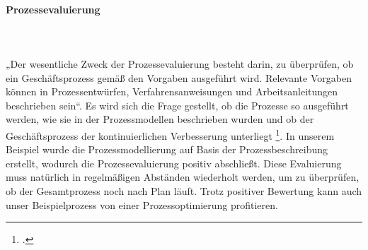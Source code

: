 \paragraph{Prozessevaluierung}\mbox{}\\\\
„Der wesentliche Zweck der Prozessevaluierung besteht darin, zu überprüfen, ob ein Geschäftsprozess gemäß den Vorgaben ausgeführt wird. Relevante Vorgaben können in Prozessentwürfen, Verfahrensanweisungen und Arbeitsanleitungen  beschrieben sein“. Es wird sich die Frage gestellt, ob die Prozesse so ausgeführt werden, wie sie in der Prozessmodellen beschrieben wurden und ob der Geschäftsprozess der kontinuierlichen Verbesserung unterliegt \footcite{Zitat fehlt}. In unserem Beispiel wurde die Prozessmodellierung auf Basis der Prozessbeschreibung erstellt, wodurch die Prozessevaluierung positiv abschließt. Diese Evaluierung muss natürlich in regelmäßigen Abständen wiederholt werden, um zu überprüfen, ob der Gesamtprozess noch nach Plan läuft. Trotz positiver Bewertung kann auch unser Beispielprozess von einer Prozessoptimierung profitieren.

